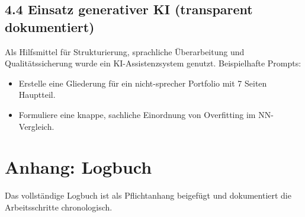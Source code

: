 \documentclass[11pt,a4paper,ngerman,openany]{report}
\begin{document}
\subsection*{4.4 Einsatz generativer KI (transparent dokumentiert)}
Als Hilfsmittel f\"ur Strukturierung, sprachliche \"Uberarbeitung und Qualit\"atssicherung wurde ein KI-Assistenzsystem genutzt.
Beispielhafte Prompts:
\begin{itemize}[leftmargin=*,itemsep=0.05em,topsep=0.05em]
    \item \glqq Erstelle eine Gliederung f\"ur ein nicht-sprecher Portfolio mit 7 Seiten Hauptteil.\grqq{}
    \item \glqq Formuliere eine knappe, sachliche Einordnung von Overfitting im NN-Vergleich.\grqq{}
\end{itemize}
\normalsize

\label{lastmainpage}

\newpage

\section*{Anhang: Logbuch}
\label{sec:logbuch-anhang}
Das vollst\"andige Logbuch ist als Pflichtanhang beigef\"ugt und dokumentiert die Arbeitsschritte chronologisch.


\end{document}
